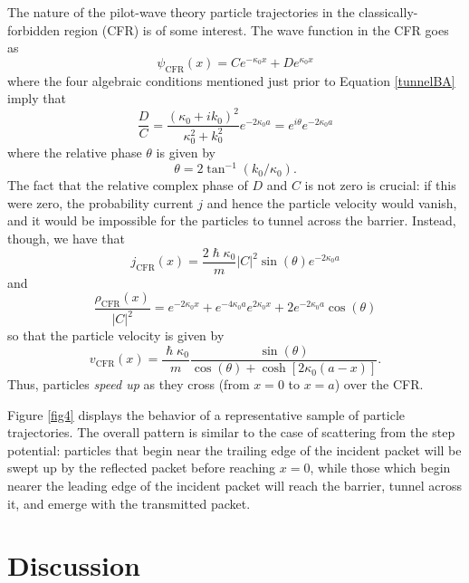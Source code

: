 \documentclass[aps,prc,onecolumn,letterpaper,floatfix,12pt]{revtex4}
\renewcommand{\hbar}{\hslash}
\begin{document}
The nature of the pilot-wave theory particle 
trajectories in the classically-forbidden region 
(CFR) is of some interest.  The wave function in the
CFR goes as
\begin{equation}
\psi_{\text{CFR}}(x) = C e^{-\kappa_0 x} + D e^{\kappa_0 x}
\end{equation}
where the four algebraic conditions mentioned
just prior to Equation \eqref{tunnelBA} imply that 
\begin{equation}
\frac{D}{C} = \frac{(\kappa_0 + i k_0)^2}{\kappa_0^2 + k_0^2} e^{-2
  \kappa_0 a} = e^{i \theta} e^{-2 \kappa_0 a}
\end{equation}
where the relative phase $\theta$ is given by
\begin{equation}
\theta = 2 \tan^{-1}(k_0/\kappa_0).
\end{equation}
The fact that the relative complex phase of $D$ and $C$ is not zero is
crucial:  if this were zero, the probability current $j$ and hence the
particle velocity would vanish, and it would be impossible for the
particles to tunnel across the barrier.  Instead, though, we have that
\begin{equation}
j_{\text{CFR}}(x) = \frac{2 \hbar \kappa_0}{m} |C|^2 \sin(\theta)
e^{-2 \kappa_0 a}
\end{equation}
and
\begin{equation}
\frac{\rho_{\text{CFR}}(x)}{|C|^2} =  e^{-2 \kappa_0 x} + e^{-4 \kappa_0 a} e^{2 \kappa_0 x} + 2 e^{-2 \kappa_0 a} \cos(\theta) 
\end{equation}
so that the particle velocity is given by
\begin{equation}
v_{\text{CFR}}(x) = \frac{\hbar \kappa_0}{m} \frac{ \sin(\theta)
}{\cos(\theta) + \cosh\left[ 2 \kappa_0 (a-x)\right]}.
\end{equation}
Thus, particles \emph{speed up} as they cross (from $x=0$ to $x=a$)
over the CFR.  

Figure \ref{fig4} displays the behavior of a representative 
sample of particle trajectories.  The overall pattern is similar to
the case of scattering from the step potential:  particles that begin
near the trailing edge of the incident packet will be swept up by the
reflected packet before reaching $x=0$, while those which begin nearer
the leading edge of the incident packet will reach the barrier, tunnel
across it, and emerge with the transmitted packet.  


\section{Discussion}
\end{document}
